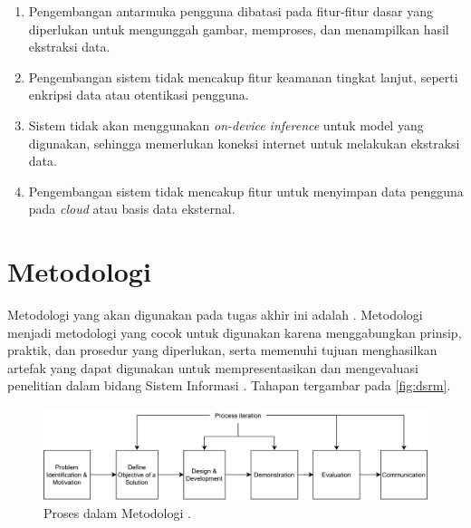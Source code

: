 \begin{enumerate}
	\item Pengembangan antarmuka pengguna dibatasi pada fitur-fitur dasar yang diperlukan untuk mengunggah gambar, memproses, dan menampilkan hasil ekstraksi data.
	\item Pengembangan sistem tidak mencakup fitur keamanan tingkat lanjut, seperti enkripsi data atau otentikasi pengguna.
	\item Sistem tidak akan menggunakan \emph{on-device inference} untuk model \dl{} yang digunakan, sehingga memerlukan koneksi internet untuk melakukan ekstraksi data.
	\item Pengembangan sistem tidak mencakup fitur untuk menyimpan data pengguna pada \emph{cloud} atau basis data eksternal.
\end{enumerate}

\section{Metodologi}
\label{sec:metodologi}

Metodologi yang akan digunakan pada tugas akhir ini adalah \dsrmfull. Metodologi \dsrm{} menjadi metodologi yang cocok untuk digunakan karena menggabungkan prinsip, praktik, dan prosedur yang diperlukan, serta memenuhi tujuan menghasilkan artefak yang dapat digunakan untuk mempresentasikan dan mengevaluasi penelitian dalam bidang Sistem Informasi \parencite{peffers2007dsrm}. Tahapan \dsrm{} tergambar pada \autoref{fig:dsrm}.

\begin{figure}[htbp]
	\centering
	\includegraphics[width=.8\textwidth]{images/dsrm.png}
	\caption{Proses dalam Metodologi \dsrm{} \parencite{peffers2007dsrm}.}
	\label{fig:dsrm}
\end{figure}

